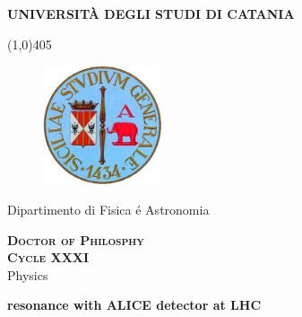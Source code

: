 \begin{titlepage}

\begin{center}
\begin{large}
\textbf{UNIVERSIT\`A DEGLI STUDI DI CATANIA} \\
\end{large}
\end{center}

\line(1,0){405} \\

\begin{figure}[htbp]
\begin{center}
\includegraphics[angle=0, height=3.5cm]{Images/Logo.jpg}
\end{center}
\end{figure}

\begin{center}
\begin{large}
Dipartimento di Fisica \'e Astronomia \\
\end{large}
\end{center}

\vspace{3pt}

\begin{center}
\begin{normalsize}
\textsc{ \bf Doctor of Philosphy} \\
\vspace{2pt} 
\textsc{\bf Cycle XXXI} \\
\vspace{3pt} 
Physics\\
\end{normalsize}
\end{center}

\vspace{2.0cm}
 
\begin{LARGE}
\begin{center}
\textbf{\comkch resonance with ALICE detector at LHC}
\end{center}
\end{LARGE}


\end{titlepage}
